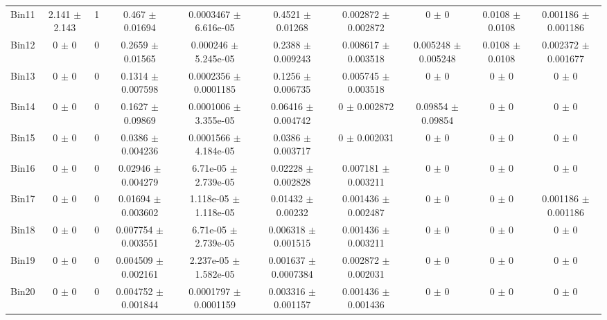 \begin{tabular}{@{\extracolsep{4pt}}lccccccccc@{}}
     Bin11 & 2.141 $\pm$ 2.143 & 1 & 0.467 $\pm$ 0.01694 & 0.0003467 $\pm$ 6.616e-05 & 0.4521 $\pm$ 0.01268 & 0.002872 $\pm$ 0.002872 & 0 $\pm$ 0 & 0.0108 $\pm$ 0.0108 & 0.001186 $\pm$ 0.001186 \\ 
     Bin12 & 0 $\pm$ 0 & 0 & 0.2659 $\pm$ 0.01565 & 0.000246 $\pm$ 5.245e-05 & 0.2388 $\pm$ 0.009243 & 0.008617 $\pm$ 0.003518 & 0.005248 $\pm$ 0.005248 & 0.0108 $\pm$ 0.0108 & 0.002372 $\pm$ 0.001677 \\ 
     Bin13 & 0 $\pm$ 0 & 0 & 0.1314 $\pm$ 0.007598 & 0.0002356 $\pm$ 0.0001185 & 0.1256 $\pm$ 0.006735 & 0.005745 $\pm$ 0.003518 & 0 $\pm$ 0 & 0 $\pm$ 0 & 0 $\pm$ 0 \\ 
     Bin14 & 0 $\pm$ 0 & 0 & 0.1627 $\pm$ 0.09869 & 0.0001006 $\pm$ 3.355e-05 & 0.06416 $\pm$ 0.004742 & 0 $\pm$ 0.002872 & 0.09854 $\pm$ 0.09854 & 0 $\pm$ 0 & 0 $\pm$ 0 \\ 
     Bin15 & 0 $\pm$ 0 & 0 & 0.0386 $\pm$ 0.004236 & 0.0001566 $\pm$ 4.184e-05 & 0.0386 $\pm$ 0.003717 & 0 $\pm$ 0.002031 & 0 $\pm$ 0 & 0 $\pm$ 0 & 0 $\pm$ 0 \\ 
     Bin16 & 0 $\pm$ 0 & 0 & 0.02946 $\pm$ 0.004279 & 6.71e-05 $\pm$ 2.739e-05 & 0.02228 $\pm$ 0.002828 & 0.007181 $\pm$ 0.003211 & 0 $\pm$ 0 & 0 $\pm$ 0 & 0 $\pm$ 0 \\ 
     Bin17 & 0 $\pm$ 0 & 0 & 0.01694 $\pm$ 0.003602 & 1.118e-05 $\pm$ 1.118e-05 & 0.01432 $\pm$ 0.00232 & 0.001436 $\pm$ 0.002487 & 0 $\pm$ 0 & 0 $\pm$ 0 & 0.001186 $\pm$ 0.001186 \\ 
     Bin18 & 0 $\pm$ 0 & 0 & 0.007754 $\pm$ 0.003551 & 6.71e-05 $\pm$ 2.739e-05 & 0.006318 $\pm$ 0.001515 & 0.001436 $\pm$ 0.003211 & 0 $\pm$ 0 & 0 $\pm$ 0 & 0 $\pm$ 0 \\ 
     Bin19 & 0 $\pm$ 0 & 0 & 0.004509 $\pm$ 0.002161 & 2.237e-05 $\pm$ 1.582e-05 & 0.001637 $\pm$ 0.0007384 & 0.002872 $\pm$ 0.002031 & 0 $\pm$ 0 & 0 $\pm$ 0 & 0 $\pm$ 0 \\ 
     Bin20 & 0 $\pm$ 0 & 0 & 0.004752 $\pm$ 0.001844 & 0.0001797 $\pm$ 0.0001159 & 0.003316 $\pm$ 0.001157 & 0.001436 $\pm$ 0.001436 & 0 $\pm$ 0 & 0 $\pm$ 0 & 0 $\pm$ 0 \\ 
\hline\hline
  \end{tabular}
